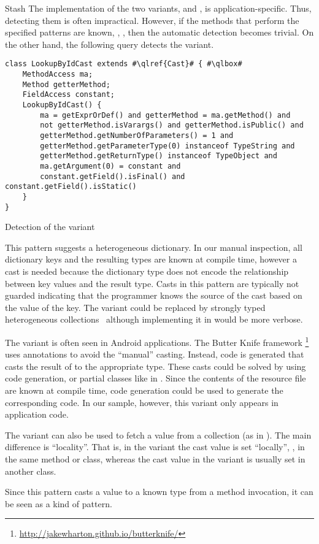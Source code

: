 \begin{pattern}{Stash}
\detection{}
The implementation of the two variants,
 and , is application-specific.
Thus, detecting them is often impractical.
However, if the methods that perform the specified patterns are known,
\eg{}, , then the automatic detection becomes trivial.
On the other hand, the following query detects the  variant.

\begin{listing}
\begin{verbatim}
class LookupByIdCast extends #\qlref{Cast}# { #\qlbox#
	MethodAccess ma;
	Method getterMethod;
	FieldAccess constant;
	LookupByIdCast() {
		ma = getExprOrDef() and getterMethod = ma.getMethod() and
		not getterMethod.isVarargs() and getterMethod.isPublic() and
		getterMethod.getNumberOfParameters() = 1 and
		getterMethod.getParameterType(0) instanceof TypeString and
		getterMethod.getReturnType() instanceof TypeObject and
		ma.getArgument(0) = constant and
		constant.getField().isFinal() and constant.getField().isStatic()
	}
}
\end{verbatim}
\caption{Detection of the  variant}
\end{listing}


\issues{}
This pattern suggests a heterogeneous dictionary.
In our manual inspection,
all dictionary keys and the resulting types are known at compile time,
however a cast is needed because the dictionary type does not encode the
relationship between key values and the result type.
Casts in this pattern are typically not guarded indicating that the programmer knows the source of the cast based on the value of the key.
The  variant could be replaced by 
strongly typed heterogeneous collections~\citep{kiselyovStronglyTypedHeterogeneous2004} although implementing it in \java{} would be more verbose.

The  variant is often seen in Android applications.
The Butter Knife framework%
\footnote{\url{http://jakewharton.github.io/butterknife/}}
uses annotations to avoid the ``manual'' casting.
Instead, code is generated that casts the result of  to the appropriate type.
These casts could be solved by using code generation,
or partial classes like in \csharp{}.
Since the contents of the resource file are known at compile time,
code generation could be used to generate the corresponding \java{} code.
In our sample, however, this variant only appears in application code.

The  variant can also be used to fetch a value from a collection
(as in ).
The main difference is ``locality''.
That is, in the  variant the cast value is set ``locally'', \ie{},
in the same method or class,
whereas the cast value in the  variant is usually set in another class.

Since this pattern casts a value to a known type from a method invocation,
it can be seen as a kind of  pattern.

\end{pattern}
